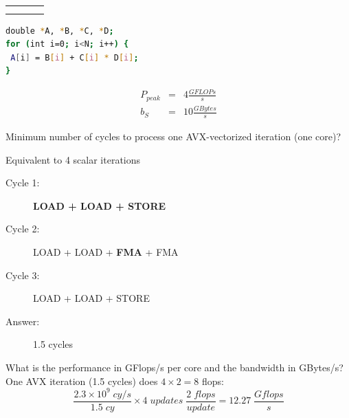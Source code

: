 \documentclass{article}
\begin{document}
\begin{enumerate}
\begin{table}[!htp]
\begin{tabular}{|l|l|l|l|}
&                        &                                                                                      &       \\
&                        &                                                                                      &       \\\hline
\end{tabular}
\end{table}
\begin{minipage}{.3\textwidth} 
\begin{lstlisting}[language=bash,numbers=none,basicstyle=\scriptsize] 
double *A, *B, *C, *D;
for (int i=0; i<N; i++) {
 A[i] = B[i] + C[i] * D[i];
}
\end{lstlisting} 
\begin{eqnarray*}
P_{peak}  &  = & 4 \frac{GFLOPs}{s}\\
b_S & = & 10 \frac{GBytes}{s}
\end{eqnarray*}
\end{minipage}
\begin{minipage}{.1\textwidth} 
\end{minipage}
\begin{minipage}{.6\textwidth} 
\end{minipage}


Minimum number of cycles to process one AVX-vectorized iteration (one core)? 

Equivalent to 4 scalar iterations
\begin{description}
 \item [Cycle 1:] \textbf{LOAD + LOAD + STORE}
 \item [Cycle 2:] LOAD + LOAD + \textbf{FMA} + FMA
 \item [Cycle 3:] LOAD + LOAD + STORE
 \item [Answer:] 1.5 cycles
\end{description}

What is the performance in GFlops/s per core and the bandwidth in GBytes/s? \\

One AVX iteration (1.5 cycles) does $4 \times 2 = 8$ flops:
\begin{equation*}
\frac{2.3 \times 10^9 \; cy/s}{1.5 \; cy}\times 4\; updates\; \frac{2 \; flops}{update} = 12.27 \; \frac{Gflops}{s}
\end{equation*}


\end{enumerate}
\end{document}
